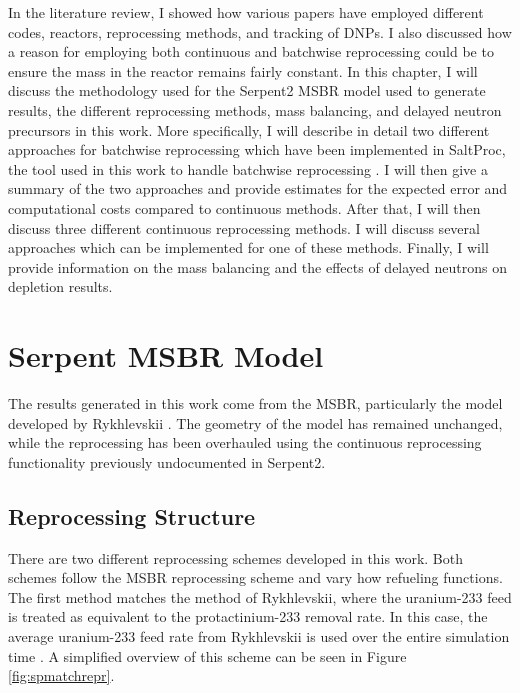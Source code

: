 \renewcommand*\descriptionlabel[1]{\hspace\leftmargin$#1$}
\setcounter{tocdepth}{5}
\setcounter{secnumdepth}{5}



In the literature review, I showed how various papers have employed different codes, reactors, reprocessing methods, and tracking of DNPs. I also discussed how a reason for employing both continuous and batchwise reprocessing could be to ensure the mass in the reactor remains fairly constant. In this chapter, I will discuss the methodology used for the Serpent2 MSBR model used to generate results, the different reprocessing methods, mass balancing, and delayed neutron precursors in this work.
More specifically, I will describe in detail two different approaches for batchwise reprocessing which have been implemented in SaltProc, the tool used in this work to handle batchwise reprocessing \cite{rykhlevskii_saltproc_2018}. I will then give a summary of the two approaches and provide estimates for the expected error and computational costs compared to continuous methods.
After that, I will then discuss three different continuous reprocessing methods.
I will discuss several approaches which can be implemented for one of these methods.
Finally, I will provide information on the mass balancing and the effects of delayed neutrons on depletion results.


\section{Serpent MSBR Model}

The results generated in this work come from the MSBR, particularly the model developed by Rykhlevskii \cite{rykhlevskii_advanced_2018}. The geometry of the model has remained unchanged, while the reprocessing has been overhauled using the continuous reprocessing functionality previously undocumented in Serpent2. %

\subsection{Reprocessing Structure}
\label{s:decay-tank}

There are two different reprocessing schemes developed in this work. Both schemes follow the MSBR reprocessing scheme and vary how refueling functions. The first method matches the method of Rykhlevskii, where the uranium-233 feed is treated as equivalent to the protactinium-233 removal rate. In this case, the average uranium-233 feed rate from Rykhlevskii is used over the entire simulation time \cite{rykhlevskii_advanced_2018}. A simplified overview of this scheme can be seen in Figure \ref{fig:spmatchrepr}.


